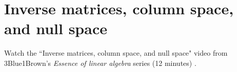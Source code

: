 \section{Inverse matrices, column space, and null space}

Watch the ``Inverse matrices, column space, and null space" video from
3Blue1Brown's \textit{Essence of linear algebra} series (12 minutes)
\cite{bib:linalg_inverse_matrices_column_space_and_null_space}.
